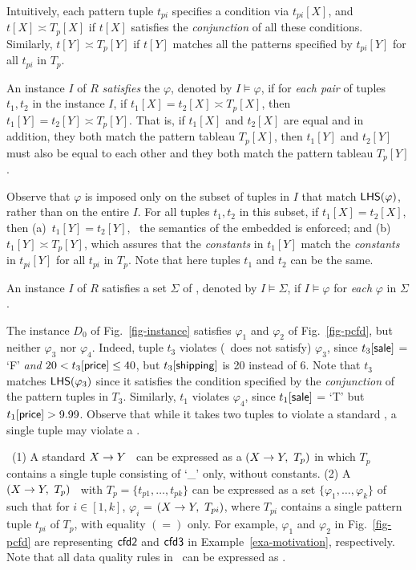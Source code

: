 Intuitively, each pattern tuple $t_{pi}$ specifies a condition via
$t_{pi}[X]$,
and $t[X] \asymp T_p[X]$ if
 $t[X]$ satisfies the {\em conjunction} of all these conditions.
Similarly, $t[Y] \asymp T_p[Y]$ if $t[Y]$ matches all the patterns
specified by $t_{pi}[Y]$ for all $t_{pi}$ in $T_p$.

An instance $I$ of $R$ {\em satisfies} the \pCFD $\varphi$, denoted
by $I \models \varphi$, if  for {\em each pair} of tuples $t_1, t_2$
in the instance $I$, if $t_1[X] = t_2[X] \asymp T_p[X]$, then
$t_1[Y] = t_2[Y] \asymp T_p[Y]$.  That is, if $t_1[X]$ and $t_2[X]$
are equal and in addition, they both match the pattern tableau
$T_p[X]$, then $t_1[Y]$ and $t_2[Y]$ must also be equal to each
other and they both match the pattern tableau $T_p[Y]$.

Observe that $\varphi$ is imposed only on the subset of tuples in
$I$ that match ${\mathsf{LHS}}(\varphi)$, rather than on the entire $I$. For
all tuples $t_1, t_2$ in this subset, if $t_1[X] = t_2[X]$, then
(a)~$t_1[Y] = t_2[Y]$, \ie~the semantics of the embedded \FDs is
enforced; and (b)~$t_1[Y] \asymp T_p[Y]$, which assures that the
{\em constants} in $t_1[Y]$ match the {\em constants} in $t_{pi}[Y]$
for all $t_{pi}$ in $T_p$. Note that here tuples $t_1$ and $t_2$ can
be the same.



An instance $I$ of $R$ satisfies a set $\Sigma$ of \pCFDs,
denoted by $I\models\Sigma$, if $I\models\varphi$ for {\em each}
\pCFD $\varphi$ in $\Sigma$.

\vspace{-1ex}
\begin{example}
The instance $D_0$ of
Fig.~\ref{fig-instance} satisfies $\varphi_1$ and $\varphi_2$ of
Fig.~\ref{fig-pcfd}, but neither $\varphi_3$ nor
$\varphi_4$. Indeed, tuple $t_3$ violates (\ie~does not satisfy)
$\varphi_3$, since
$t_3[\protect\mathsf{sale}]$ = `F' {\em and} $20 < t_3[\protect\mathsf{price}] \le 40$,
but $t_3[\protect\mathsf{shipping}]$ is 20 instead of $6$.
Note that $t_3$ matches ${\mathsf{LHS}}(\varphi_3)$ since it satisfies
the condition specified by the {\em conjunction}
of the pattern tuples in $T_3$.
Similarly, $t_1$ violates $\varphi_4$, since
$t_1[\protect\mathsf{sale}]$ = `T' but $t_1[\protect\mathsf{price}] > 9.99$.
Observe that while it takes two tuples
to violate a standard \FD, a single tuple may violate a
\pCFD. \eop
\end{example}
\vspace{-1.5ex}

~(1) A standard \FD $X\rightarrow Y$~\cite{AbHuVi1995} can
be expressed as a \CFD $(X\rightarrow Y,\ T_p)$ in which $T_p$ contains a
single tuple consisting of `\_' only, without constants. (2) A
\CFD $(X\rightarrow Y,\ T_p)$~\cite{CFDs} with
$T_p = \{t_{p1},\ldots, t_{pk}\}$ can be
expressed as a set $\{\varphi_1,\ldots,\varphi_k\}$ of
\pCFDs such that for $i\in [1, k]$, $\varphi_i$ = $(X\rightarrow Y,\
T_{pi})$, where $T_{pi}$ contains a single pattern tuple $t_{pi}$ of
$T_p$, with equality $(=)$ only.
For example, $\varphi_1$ and $\varphi_2$ in
Fig.~\ref{fig-pcfd} are \pCFDs representing \FD ${\mathsf{cfd2}}$
and \CFD ${\mathsf{cfd3}}$ in Example~\ref{exa-motivation}, respectively.
Note that all data quality
rules in~\cite{CM08,divesh08} can be expressed as
\pCFDs.
